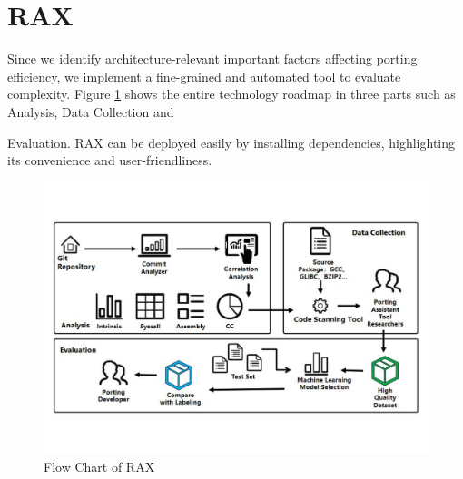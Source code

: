 \documentclass[sigconf,screen,review,anonymous]{acmart}
\begin{document}
\section{RAX}
Since we identify architecture-relevant important
factors affecting porting efficiency, we implement a fine-grained and automated tool to evaluate complexity. Figure \ref{fig:figure1} shows the entire technology roadmap in three parts such as Analysis, Data Collection and {Evaluation. RAX can be deployed easily by installing dependencies, highlighting its convenience and user-friendliness.

\begin{figure}
  \centering
  \includegraphics[width=\linewidth]{figure1.pdf}
  \caption{Flow Chart of RAX}
  \label{fig:figure1}
\end{figure}

}
\end{document}
